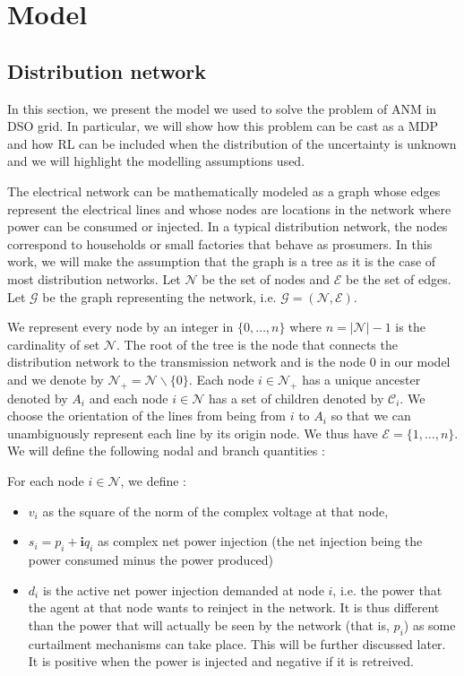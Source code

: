 \section{Model}
\label{sec:model}

\subsection{Distribution network}

In this section, we present the model we used to solve the problem of ANM in DSO grid.
In particular, we will show how this problem can be cast as a MDP and how RL can be included when the distribution of the uncertainty is unknown and we will highlight the modelling assumptions used.

The electrical network can be mathematically modeled as a graph whose edges represent the electrical lines and whose nodes are locations in the network where power can be consumed or injected.
In a typical distribution network, the nodes correspond to households or small factories that behave as prosumers.
In this work, we will make the assumption that the graph is a tree as it is the case of most distribution networks.
Let $\mathcal{N}$ be the set of nodes and $\mathcal{E}$ be the set of edges.
Let $\mathcal{G}$ be the graph representing the network, i.e. $\mathcal{G} = (\mathcal{N}, \mathcal{E})$.

We represent every node by an integer in $\{0, \dots, n\}$ where $n = |\mathcal{N}|-1$ is the cardinality of set $\mathcal{N}$.
The root of the tree is the node that connects the distribution network to the transmission network and is the node $0$ in our model and we denote by $\mathcal{N}_+ = \mathcal{N} \backslash \{0\}$.
Each node $i \in \mathcal{N}_+$ has a unique ancester denoted by $A_i$ and each node $i \in \mathcal{N}$ has a set of children denoted by $\mathcal{C}_i$.
We choose the orientation of the lines from being from $i$ to $A_i$ so that we can unambiguously represent each line by its origin node.
We thus have $\mathcal{E} = \{1, \dots, n\}$.
We will define the following nodal and branch quantities :

For each node $i \in \mathcal{N}$, we define :
\begin{itemize}
  \item $v_i$ as the square of the norm of the complex voltage at that node,
  \item $s_i = p_i + \mathbf{i} q_i$ as complex net power injection (the net injection being the power consumed minus the power produced)
  \item $d_i$ is the active net power injection demanded at node $i$, i.e. the power that the agent at that node wants to reinject in the network.
  It is thus different than the power that will actually be seen by the network (that is, $p_{i}$) as some curtailment mechanisms can take place.
  This will be further discussed later.
  It is positive when the power is injected and negative if it is retreived.
\end{itemize}

